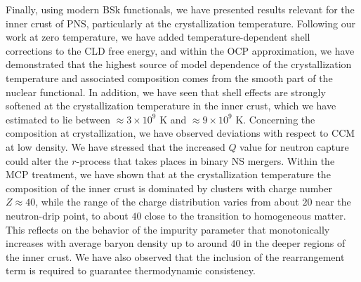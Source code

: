 Finally, using modern BSk functionals, we have presented results relevant for 
the inner crust of PNS, particularly at the crystallization temperature.
Following our work at zero temperature, we have added temperature-dependent 
shell corrections to the CLD free energy, and within the OCP approximation, we 
have demonstrated that the highest source of model dependence of the 
crystallization temperature and associated composition comes from the smooth 
part of the nuclear functional. In addition, we have seen that shell 
effects are strongly softened at the crystallization temperature in the inner 
crust, which we have estimated to lie between $\approx 3\times 10^9$ K and 
$\approx 9\times 10^9$ K. 
Concerning the composition at crystallization, we have observed deviations with 
respect to CCM at low density. We have stressed that the increased $Q$ value
for neutron capture could alter the $r$-process that takes places in binary NS 
mergers.
Within the MCP treatment, we have shown that at the crystallization temperature
the composition of the inner crust is dominated by clusters with charge number
$Z\approx 40$, while the range of the charge distribution varies from about 
$20$ near the neutron-drip point, to about $40$ close to the transition to
homogeneous matter.
This reflects on the behavior of the impurity parameter that monotonically 
increases with average baryon density up to around $40$ in the deeper regions 
of the inner crust.
We have also observed that the inclusion of the rearrangement term is required 
to guarantee thermodynamic consistency.

\clearpage\thispagestyle{empty}
